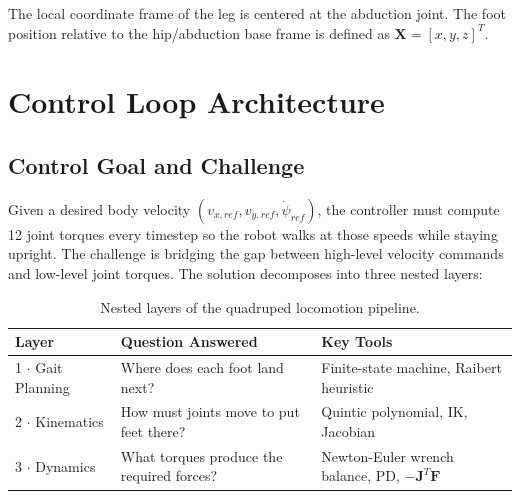 \documentclass[11pt,a4paper]{article}
\begin{document}
The local coordinate frame of the leg is centered at the abduction joint. The foot position relative to the hip/abduction base frame is defined as $\mathbf{X} = [x, y, z]^T$.

\section{Control Loop Architecture}

\subsection{Control Goal and Challenge}
Given a desired body velocity $(v_{x,ref}, v_{y,ref}, \dot{\psi}_{ref})$, the controller must compute 12 joint torques every timestep so the robot walks at those speeds while staying upright. The challenge is bridging the gap between high-level velocity commands and low-level joint torques. The solution decomposes into three nested layers:

\begin{table}[h!]
\centering
\begin{tabular}{lll}
\toprule
\textbf{Layer} & \textbf{Question Answered} & \textbf{Key Tools} \\
\midrule
1 $\cdot$ Gait Planning & Where does each foot land next? & Finite-state machine, Raibert heuristic \\
2 $\cdot$ Kinematics & How must joints move to put feet there? & Quintic polynomial, IK, Jacobian \\
3 $\cdot$ Dynamics & What torques produce the required forces? & Newton-Euler wrench balance, PD, $-\mathbf{J}^T\mathbf{F}$ \\
\bottomrule
\end{tabular}
\caption{Nested layers of the quadruped locomotion pipeline.}
\end{table}
\end{document}
